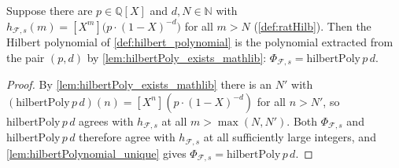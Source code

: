 \begin{corollary}
  \label{cor:hilbertPolynomial_eq_hilbertPoly}
  Suppose there are \(p \in \mathbb{Q}[X]\) and \(d, N \in \mathbb{N}\) with
  \(h_{\mathcal{F},s}(m) = [X^m]\bigl(p \cdot (1-X)^{-d}\bigr)\) for all
  \(m > N\) (\cref{def:ratHilb}). Then the Hilbert polynomial of
  \cref{def:hilbert_polynomial} is the polynomial extracted from the pair
  \((p, d)\) by \cref{lem:hilbertPoly_exists_mathlib}:
  \(\Phi_{\mathcal{F},s} = \mathrm{hilbertPoly}\,p\,d\).
\end{corollary}

\begin{proof}
  \leanok
  By \cref{lem:hilbertPoly_exists_mathlib} there is an \(N'\) with
  \((\mathrm{hilbertPoly}\,p\,d)(n) = [X^n](p\cdot(1-X)^{-d})\) for all
  \(n > N'\), so \(\mathrm{hilbertPoly}\,p\,d\) agrees with
  \(h_{\mathcal{F},s}\) at all \(m > \max(N, N')\). Both
  \(\Phi_{\mathcal{F},s}\) and \(\mathrm{hilbertPoly}\,p\,d\) therefore agree
  with \(h_{\mathcal{F},s}\) at all sufficiently large integers, and
  \cref{lem:hilbertPolynomial_unique} gives
  \(\Phi_{\mathcal{F},s} = \mathrm{hilbertPoly}\,p\,d\).
\end{proof}

